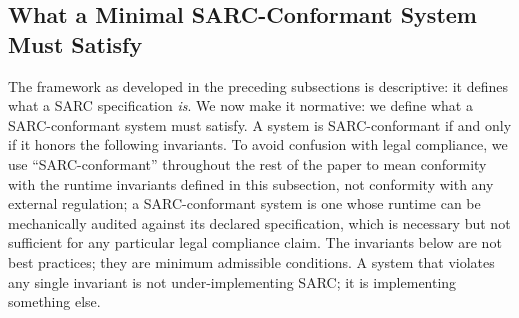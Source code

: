 \documentclass[11pt,a4paper]{article}
\theoremstyle{remark}
\begin{document}
\subsection{What a Minimal SARC-Conformant System Must Satisfy}\label{sec:invariants}

The framework as developed in the preceding subsections is descriptive: it defines what a SARC specification \emph{is}. We now make it normative: we define what a SARC-conformant system must satisfy. A system is SARC-conformant if and only if it honors the following invariants. To avoid confusion with legal compliance, we use ``SARC-conformant'' throughout the rest of the paper to mean conformity with the runtime invariants defined in this subsection, not conformity with any external regulation; a SARC-conformant system is one whose runtime can be mechanically audited against its declared specification, which is necessary but not sufficient for any particular legal compliance claim. The invariants below are not best practices; they are minimum admissible conditions. A system that violates any single invariant is not under-implementing SARC; it is implementing something else.
\end{document}
